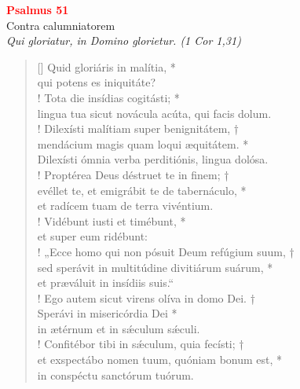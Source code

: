 


\def\greinitialformat#1{%
{\fontsize{39}{39}\selectfont #1}%
}




\vspace{0.3cm}
\begin{center}
 \textcolor{red}{\large \bf Psalmus 51}\\
Contra calumniatorem\\
\textit{\small Qui gloriatur, in Domino glorietur. (1 Cor 1,31)}
\end{center}
\begin{verse}[\versewidth]
Quid gloriáris in malítia, *\\
qui potens es iniquitáte?\\!
\vin Tota die insídias cogitásti; *\\
\vin lingua tua sicut novácula acúta, qui facis dolum.\\!
Dilexísti malítiam super benignitátem, †\\
mendácium magis quam loqui æquitátem. *\\
Dilexísti ómnia verba perditiónis, lingua dolósa.\\!
\vin Proptérea Deus déstruet te in finem; †\\
\vin evéllet te, et emigrábit te de tabernáculo, *\\
\vin et radícem tuam de terra vivéntium.\\!
Vidébunt iusti et timébunt, *\\
et super eum ridébunt:\\!
\vin „Ecce homo qui non pósuit Deum refúgium suum, †\\
\vin sed sperávit in multitúdine divitiárum suárum, *\\
\vin et præváluit in insídiis suis.“\\!
Ego autem sicut virens olíva in domo Dei. †\\
Sperávi in misericórdia Dei *\\
in ætérnum et in s\'{æ}culum s\'{æ}culi.\\!
\vin Confitébor tibi in s\'{æ}culum, quia fecísti; †\\
\vin et exspectábo nomen tuum, quóniam bonum est, *\\
\vin in conspéctu sanctórum tuórum.\\
\end{verse}
\vspace{1cm}


